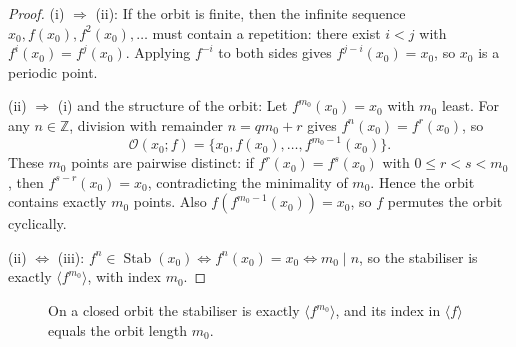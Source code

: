 \begin{proof}
(i) $\Rightarrow$ (ii): If the orbit is finite, then the infinite sequence $x_0,f(x_0),f^2(x_0),\dots$ must contain a repetition: there exist $i<j$ with $f^i(x_0)=f^j(x_0)$. Applying $f^{-i}$ to both sides gives $f^{j-i}(x_0)=x_0$, so $x_0$ is a periodic point.

(ii) $\Rightarrow$ (i) and the structure of the orbit: Let $f^{m_0}(x_0)=x_0$ with $m_0$ least. For any $n\in\mathbb{Z}$, division with remainder $n=qm_0+r$ gives $f^n(x_0)=f^r(x_0)$, so
\[
\mathcal{O}(x_0;f)=\{x_0,f(x_0),\dots,f^{m_0-1}(x_0)\}.
\]
These $m_0$ points are pairwise distinct: if $f^r(x_0)=f^s(x_0)$ with $0\le r<s<m_0$, then $f^{s-r}(x_0)=x_0$, contradicting the minimality of $m_0$. Hence the orbit contains exactly $m_0$ points. Also $f(f^{m_0-1}(x_0))=x_0$, so $f$ permutes the orbit cyclically.

(ii) $\iff$ (iii): $f^n\in\operatorname{Stab}(x_0)\iff f^n(x_0)=x_0\iff m_0\mid n$, so the stabiliser is exactly $\langle f^{m_0}\rangle$, with index $m_0$.
\end{proof}

\begin{figure}[htbp]
\centering
{}
\caption{On a closed orbit the stabiliser is exactly $\langle f^{m_0}\rangle$, and its index in $\langle f\rangle$ equals the orbit length $m_0$.}
\label{fig:closed_orbit_stabilizer}
\end{figure}

